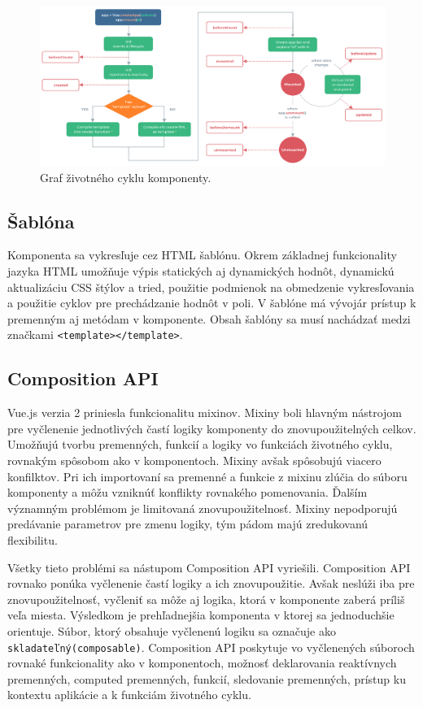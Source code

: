     \begin{figure}[!hbt]
        \centering
        \includegraphics[scale=0.3]{obrazky/lifecycle.png}
        \caption{Graf životného cyklu komponenty\cite{vue-guide}.}
        \label{pic:hooks}
    \end{figure}

\subsection*{Šablóna}
Komponenta sa vykresľuje cez HTML šablónu. Okrem základnej funkcionality jazyka HTML umožňuje výpis statických aj dynamických hodnôt, dynamickú aktualizáciu CSS štýlov a tried, použitie podmienok na obmedzenie vykresľovania a použitie cyklov pre prechádzanie hodnôt v poli. V šablóne má vývojár prístup k premenným aj metódam v komponente. Obsah šablóny sa musí nachádzať medzi značkami \texttt{<template></template>}.

\subsection{Composition API}
\label{compositionapi}
Vue.js verzia 2 priniesla funkcionalitu mixinov. Mixiny boli hlavným nástrojom pre vyčlenenie jednotlivých častí logiky komponenty do znovupoužitelných celkov. Umožňujú tvorbu premenných, funkcií a logiky vo funkciách životného cyklu, rovnakým spôsobom ako v komponentoch. Mixiny avšak spôsobujú viacero konfilktov. Pri ich importovaní sa premenné a funkcie z mixinu zlúčia do súboru komponenty a môžu vzniknúť konflikty rovnakého pomenovania. Ďalším významným problémom je limitovaná znovupoužitelnosť. Mixiny nepodporujú predávanie parametrov pre zmenu logiky, tým pádom majú zredukovanú flexibilitu.

Všetky tieto problémi sa nástupom Composition API vyriešili. Composition API rovnako ponúka vyčlenenie častí logiky a ich znovupoužitie. Avšak neslúži iba pre znovupoužitelnosť, vyčleniť sa môže aj logika, ktorá v komponente zaberá príliš veľa miesta.  Výsledkom je prehľadnejšia komponenta v ktorej sa jednoduchšie orientuje. Súbor, ktorý obsahuje vyčlenenú logiku sa označuje ako \texttt{skladateľný(composable)}. Composition API poskytuje vo vyčlenených súboroch rovnaké funkcionality ako v komponentoch, možnosť deklarovania reaktívnych premenných, computed premenných, funkcií, sledovanie premenných, prístup ku kontextu aplikácie a k funkciám životného cyklu.

